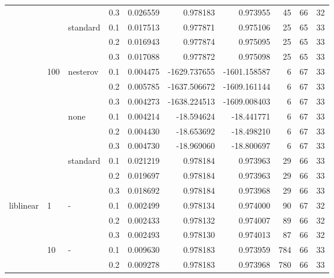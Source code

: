 \begin{table}[h!]
\begin{tabular}{llllrrrrrr}
          &     &   & 0.3 &  0.026559 &     0.978183 &     0.973955 &      45 &          66 &        32 \\
          &     & standard & 0.1 &  0.017513 &     0.977871 &     0.975106 &      25 &          65 &        33 \\
          &     &   & 0.2 &  0.016943 &     0.977874 &     0.975095 &      25 &          65 &        33 \\
          &     &   & 0.3 &  0.017088 &     0.977872 &     0.975098 &      25 &          65 &        33 \\
          & 100 & nesterov & 0.1 &  0.004475 & -1629.737655 & -1601.158587 &       6 &          67 &        33 \\
          &     &   & 0.2 &  0.005785 & -1637.506672 & -1609.161144 &       6 &          67 &        33 \\
          &     &   & 0.3 &  0.004273 & -1638.224513 & -1609.008403 &       6 &          67 &        33 \\
          &     & none & 0.1 &  0.004214 &   -18.594624 &   -18.441771 &       6 &          67 &        33 \\
          &     &   & 0.2 &  0.004430 &   -18.653692 &   -18.498210 &       6 &          67 &        33 \\
          &     &   & 0.3 &  0.004730 &   -18.969060 &   -18.800697 &       6 &          67 &        33 \\
          &     & standard & 0.1 &  0.021219 &     0.978184 &     0.973963 &      29 &          66 &        33 \\
          &     &   & 0.2 &  0.019697 &     0.978184 &     0.973963 &      29 &          66 &        33 \\
          &     &   & 0.3 &  0.018692 &     0.978184 &     0.973968 &      29 &          66 &        33 \\
liblinear & 1   & - & 0.1 &  0.002499 &     0.978134 &     0.974000 &      90 &          67 &        32 \\
          &     &   & 0.2 &  0.002433 &     0.978132 &     0.974007 &      89 &          66 &        32 \\
          &     &   & 0.3 &  0.002493 &     0.978130 &     0.974013 &      87 &          66 &        32 \\
          & 10  & - & 0.1 &  0.009630 &     0.978183 &     0.973959 &     784 &          66 &        33 \\
          &     &   & 0.2 &  0.009278 &     0.978183 &     0.973968 &     780 &          66 &        33 \\

\end{tabular}
\end{table}
